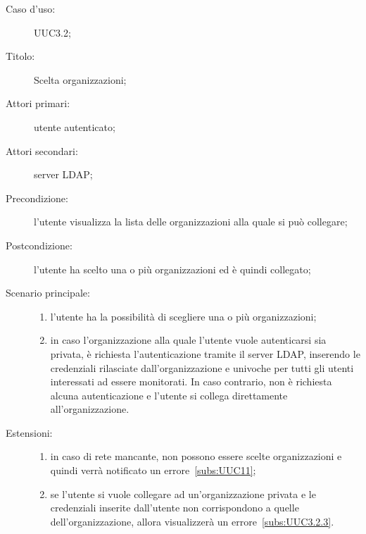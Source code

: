 \documentclass[../../../analisi-dei-requisiti.tex]{subfiles}
\begin{document}
\begin{description}
  \item[Caso d’uso:] UUC3.2;
  \item[Titolo:] Scelta organizzazioni;
  \item[Attori primari:] utente autenticato;
  \item[Attori secondari:] server LDAP\@;
  \item[Precondizione:] l'utente visualizza la lista delle organizzazioni alla quale si può collegare;
  \item[Postcondizione:] l'utente ha scelto una o più organizzazioni ed è quindi collegato;
  \item[Scenario principale:]
        \begin{enumerate}
          \item l'utente ha la possibilità di scegliere una o più organizzazioni;
          \item in caso l'organizzazione alla quale l'utente vuole autenticarsi sia privata, è richiesta l'autenticazione tramite il server LDAP, inserendo le credenziali rilasciate dall'organizzazione e univoche per tutti gli utenti interessati ad essere monitorati. In caso contrario, non è richiesta alcuna autenticazione e l'utente si collega direttamente all'organizzazione.
        \end{enumerate}
  \item[Estensioni:]
        \begin{enumerate}
          \item in caso di rete mancante, non possono essere scelte organizzazioni e quindi verrà notificato un errore~\ref{subs:UUC11};
          \item se l'utente si vuole collegare ad un'organizzazione privata e le credenziali inserite dall'utente non corrispondono a quelle dell'organizzazione, allora visualizzerà un errore~\ref{subs:UUC3.2.3}.
        \end{enumerate}
\end{description}
\end{document}
